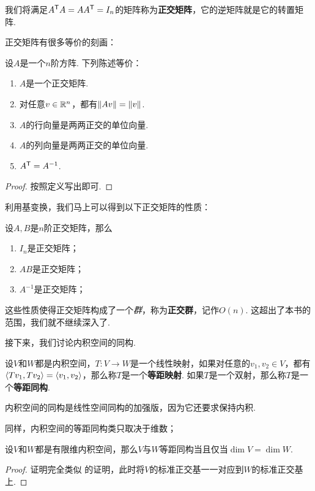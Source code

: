 我们将满足$A^{\mathsf{T}} A=AA^{\mathsf{T}}=I_n$的矩阵称为\textbf{正交矩阵}，它的逆矩阵就是它的转置矩阵. 

正交矩阵有很多等价的刻画：

\begin{theorem}\label{thm:orthogonal-matrix}
设$A$是一个$n$阶方阵. 下列陈述等价：
\begin{enumerate}
    \item $A$是一个正交矩阵.
    \item 对任意$v\in\mathbb{R}^n$，都有$\left\|Av\right\|=\left\|v\right\|$. 
    \item $A$的行向量是两两正交的单位向量.
    \item $A$的列向量是两两正交的单位向量.
    \item $A^{\mathsf{T}}=A^{-1}$.
\end{enumerate}
\end{theorem}
\begin{proof}
    按照定义写出即可. 
\end{proof}

利用基变换，我们马上可以得到以下正交矩阵的性质：

\begin{proposition}\label{prop:orthogonal-matrix-property}
设$A,B$是$n$阶正交矩阵，那么
\begin{enumerate}
    \item $I_n$是正交矩阵；
    \item $AB$是正交矩阵；
    \item $A^{-1}$是正交矩阵；
\end{enumerate}
\end{proposition}

这些性质使得正交矩阵构成了一个\textit{群}，称为\textbf{正交群}，记作$O(n)$. 这超出了本书的范围，我们就不继续深入了.


接下来，我们讨论内积空间的同构. 

\begin{definition}[等距映射与等距同构]\label{def:isometry}
设$V$和$W$都是内积空间，$T:V\to W$是一个线性映射，如果对任意的$v_1,v_2\in V$，都有$\left\langle{Tv_1},{Tv_2}\right\rangle=\left\langle{v_1},{v_2}\right\rangle$，那么称$T$是一个\textbf{等距映射}. 如果$T$是一个双射，那么称$T$是一个\textbf{等距同构}.
\end{definition}

内积空间的同构是线性空间同构的加强版，因为它还要求保持内积.

同样，内积空间的等距同构类只取决于维数；

\begin{theorem}\label{thm:isometry}
设$V$和$W$都是有限维内积空间，那么$V$与$W$等距同构当且仅当$\dim V=\dim W$. 
\end{theorem}
\begin{proof}
    证明完全类似 的证明，此时将$V$的标准正交基一一对应到$W$的标准正交基上.
\end{proof}

